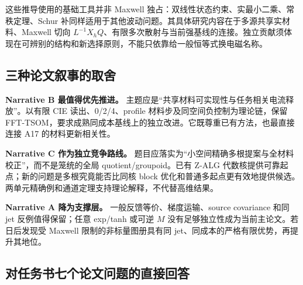 \documentclass[10pt,a4paper]{article}
\begin{document}
这些推导使用的基础工具并非 Maxwell
独占：双线性状态约束、实最小二乘、常秩定理、Schur
补同样适用于其他波动问题。其具体研究内容在于多源共享实材料、Maxwell 切向
\(L^{-1}X_hQ\)、有限多次散射与当前强基线的连接。独立贡献须体现在可辨别的结构和新选择原则，不能只依靠给一般恒等式换电磁名称。

\hypertarget{ux4e09ux79cdux8bbaux6587ux53d9ux4e8bux7684ux53d6ux820d}{%
\subsection{三种论文叙事的取舍}\label{ux4e09ux79cdux8bbaux6587ux53d9ux4e8bux7684ux53d6ux820d}}

\textbf{Narrative B 最值得优先推进。}
主题应是``共享材料可实现性与任务相关电流释放''。以有限 CIE
读出、0/2/4、profile 材料步及同空间负控制为理论链，保留
FFT-TSOM，要求成熟同成本基线上的独立改进。它既尊重已有方法，也最直接连接
A17 的材料更新相关性。

\textbf{Narrative C 作为独立竞争路线。}
题目应落实为``小空间精确多根提案与全材料校正''，而不是笼统的全局
quotient/groupoid。已有 Z-ALG
代数核提供可靠起点；新的问题是多根究竟能否比同核 block
优化和普通多起点更有效地提供候选。两单元精确例和通道定理支持理论解释，不代替高维结果。

\textbf{Narrative A 降为支撑层。} 一般反馈等价、梯度运输、source
covariance 和同 jet 反例值得保留；任意 exp/tanh 或可逆 \(M\)
没有足够独立性成为当前主论文。若日后发现受 Maxwell
限制的非标量图册具有同 jet、同成本的严格有限优势，再提升其地位。

\hypertarget{ux5bf9ux4efbux52a1ux4e66ux4e03ux4e2aux8bbaux6587ux95eeux9898ux7684ux76f4ux63a5ux56deux7b54}{%
\subsection{对任务书七个论文问题的直接回答}\label{ux5bf9ux4efbux52a1ux4e66ux4e03ux4e2aux8bbaux6587ux95eeux9898ux7684ux76f4ux63a5ux56deux7b54}}
\end{document}
